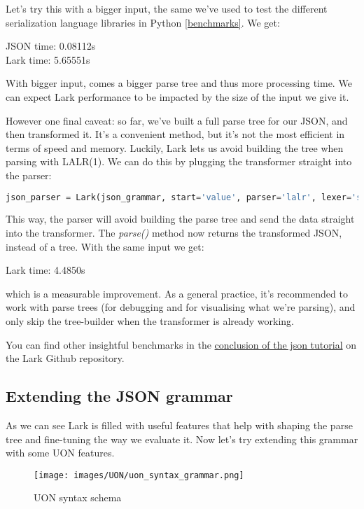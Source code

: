 \documentclass[12pt]{article}
\begin{document}
Let's try this with a bigger input, the same we've used to test the different serialization language libraries in Python \ref{benchmarks}. We get:

JSON time:  0.08112s \\
Lark time:  5.65551s

With bigger input, comes a bigger parse tree and thus more processing time. We can expect Lark performance to be impacted by the size of the input we give it.

However one final caveat: so far, we've built a full parse tree for our JSON, and then transformed it. It's a convenient method, but it's not the most efficient in terms of speed and memory. Luckily, Lark lets us avoid building the tree when parsing with LALR(1). We can do this by plugging the transformer straight into the parser:

\begin{lstlisting}[language=Python]
json_parser = Lark(json_grammar, start='value', parser='lalr', lexer='standard', transformer=TreeToJson())
\end{lstlisting}

This way, the parser will avoid building the parse tree and send the data straight into the transformer. The \emph{parse()} method now returns the transformed JSON, instead of a tree. With the same input we get:

Lark time:  4.4850s

which is a measurable improvement. As a general practice, it's recommended to work with parse trees (for debugging and for visualising what we're parsing), and only skip the tree-builder when the transformer is already working.

You can find other insightful benchmarks in the \href{https://github.com/lark-parser/lark/blob/master/docs/json_tutorial.md}{conclusion of the json tutorial} on the Lark Github repository.

\pagebreak

\subsection{Extending the JSON grammar}

As we can see Lark is filled with useful features that help with shaping the parse tree and fine-tuning the way we evaluate it. Now let’s try extending this grammar with some UON features.

\begin{figure}[ht!]
 	\centering
 	\caption{UON syntax schema}
 	\texttt{[image: images/UON/uon\_syntax\_grammar.png]}
 	\label{lab:perceptron}
\end{figure}
\end{document}
